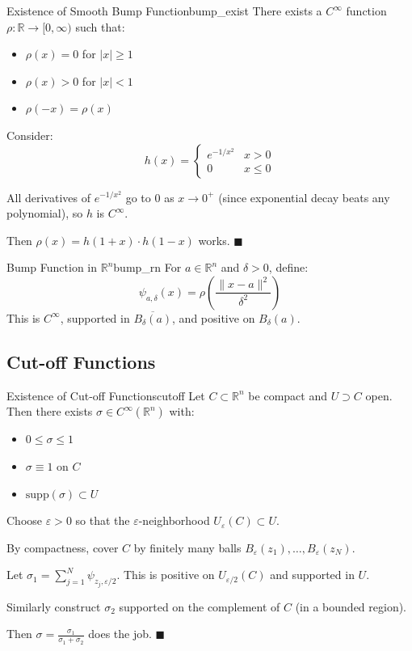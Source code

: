 \documentclass[11pt, letterpaper, openany]{book}
\renewenvironment{proof}[1][\proofname]{%
  \tcolorbox[blanker, breakable, left=1em,
    before skip=1em, after skip=1em,
    borderline west={2pt}{0pt}{MagicTeal!50},
    colback=MagicCream,
    before upper={\textcolor{MagicTeal}{\sffamily\bfseries #1.}\space}
  ]%
}{%
  \hfill\textcolor{MagicTeal}{\ensuremath{\blacksquare}}\endtcolorbox%
}
\begin{document}
\begin{lem}{Existence of Smooth Bump Function}{bump_exist}
There exists a $C^\infty$ function $\rho: \mathbb{R} \to [0, \infty)$ such that:
\begin{itemize}
    \item $\rho(x) = 0$ for $|x| \geq 1$
    \item $\rho(x) > 0$ for $|x| < 1$
    \item $\rho(-x) = \rho(x)$
\end{itemize}
\end{lem}

\begin{proof}
Consider:
\[h(x) = \begin{cases} e^{-1/x^2} & x > 0 \\ 0 & x \leq 0 \end{cases}\]

All derivatives of $e^{-1/x^2}$ go to 0 as $x \to 0^+$ (since exponential decay beats any polynomial), so $h$ is $C^\infty$.

Then $\rho(x) = h(1+x) \cdot h(1-x)$ works.
\end{proof}

\begin{defn}{Bump Function in $\mathbb{R}^n$}{bump_rn}
For $a \in \mathbb{R}^n$ and $\delta > 0$, define:
\[\psi_{a,\delta}(x) = \rho\left(\frac{\|x - a\|^2}{\delta^2}\right)\]
This is $C^\infty$, supported in $\overline{B_\delta(a)}$, and positive on $B_\delta(a)$.
\end{defn}

\subsection{Cut-off Functions}

\begin{thm}{Existence of Cut-off Functions}{cutoff}
Let $C \subset \mathbb{R}^n$ be compact and $U \supset C$ open. Then there exists $\sigma \in C^\infty(\mathbb{R}^n)$ with:
\begin{itemize}
    \item $0 \leq \sigma \leq 1$
    \item $\sigma \equiv 1$ on $C$
    \item $\text{supp}(\sigma) \subset U$
\end{itemize}
\end{thm}

\begin{proof}
Choose $\varepsilon > 0$ so that the $\varepsilon$-neighborhood $U_\varepsilon(C) \subset U$.

By compactness, cover $C$ by finitely many balls $B_\varepsilon(z_1), \ldots, B_\varepsilon(z_N)$.

Let $\sigma_1 = \sum_{j=1}^N \psi_{z_j, \varepsilon/2}$. This is positive on $U_{\varepsilon/2}(C)$ and supported in $U$.

Similarly construct $\sigma_2$ supported on the complement of $C$ (in a bounded region).

Then $\sigma = \frac{\sigma_1}{\sigma_1 + \sigma_2}$ does the job.
\end{proof}
\end{document}
